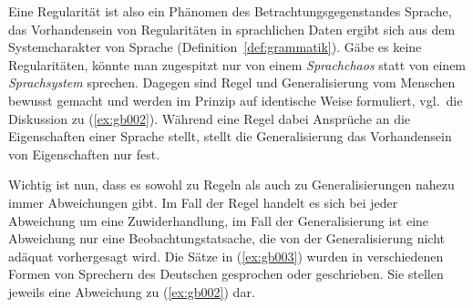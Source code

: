 Eine Regularität ist also ein Phänomen des Betrachtungsgegenstandes Sprache, das Vorhandensein von Regularitäten in sprachlichen Daten ergibt sich aus dem Systemcharakter von Sprache (Definition~\ref{def:grammatik}).
Gäbe es keine Regularitäten, könnte man zugespitzt nur von einem \textit{Sprachchaos} statt von einem \textit{Sprachsystem} sprechen.
Dagegen sind Regel und Generalisierung vom Menschen bewusst gemacht und werden im Prinzip auf identische Weise formuliert, vgl.\ die Diskussion zu (\ref{ex:gb002}).
Während eine Regel dabei Ansprüche an die Eigenschaften einer Sprache stellt, stellt die Generalisierung das Vorhandensein von Eigenschaften nur fest.

Wichtig ist nun, dass es sowohl zu Regeln als auch zu Generalisierungen nahezu immer Abweichungen gibt.
Im Fall der Regel handelt es sich bei jeder Abweichung um eine Zuwiderhandlung, im Fall der Generalisierung ist eine Abweichung nur eine Beobachtungstatsache, die von der Generalisierung nicht adäquat vorhergesagt wird.
Die Sätze in (\ref{ex:gb003}) wurden in verschiedenen Formen von Sprechern des Deutschen gesprochen oder geschrieben.
Sie stellen jeweils eine Abweichung zu (\ref{ex:gb002}) dar.

\begin{exe}
  \ex\label{ex:gb003}
  \begin{xlist}
  \end{xlist}
\end{exe}

